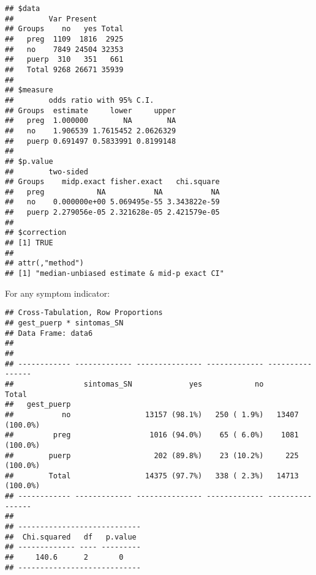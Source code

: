 \documentclass[
]{article}
\newenvironment{Shaded}{\begin{snugshade}}{\end{snugshade}}
\newcommand{\DataTypeTok}[1]{\textcolor[rgb]{0.13,0.29,0.53}{#1}}
\newcommand{\KeywordTok}[1]{\textcolor[rgb]{0.13,0.29,0.53}{\textbf{#1}}}
\newcommand{\NormalTok}[1]{#1}
\newcommand{\OperatorTok}[1]{\textcolor[rgb]{0.81,0.36,0.00}{\textbf{#1}}}
\newcommand{\OtherTok}[1]{\textcolor[rgb]{0.56,0.35,0.01}{#1}}
\newcommand{\StringTok}[1]{\textcolor[rgb]{0.31,0.60,0.02}{#1}}
\begin{document}
\begin{verbatim}
## $data
##        Var Present
## Groups    no   yes Total
##   preg  1109  1816  2925
##   no    7849 24504 32353
##   puerp  310   351   661
##   Total 9268 26671 35939
## 
## $measure
##        odds ratio with 95% C.I.
## Groups  estimate     lower     upper
##   preg  1.000000        NA        NA
##   no    1.906539 1.7615452 2.0626329
##   puerp 0.691497 0.5833991 0.8199148
## 
## $p.value
##        two-sided
## Groups    midp.exact fisher.exact   chi.square
##   preg            NA           NA           NA
##   no    0.000000e+00 5.069495e-55 3.343822e-59
##   puerp 2.279056e-05 2.321628e-05 2.421579e-05
## 
## $correction
## [1] TRUE
## 
## attr(,"method")
## [1] "median-unbiased estimate & mid-p exact CI"
\end{verbatim}

For any symptom indicator:

\begin{Shaded}
\end{Shaded}

\begin{verbatim}
## Cross-Tabulation, Row Proportions  
## gest_puerp * sintomas_SN  
## Data Frame: data6  
## 
## 
## ------------ ------------- --------------- ------------- ----------------
##                sintomas_SN             yes            no            Total
##   gest_puerp                                                             
##           no                 13157 (98.1%)   250 ( 1.9%)   13407 (100.0%)
##         preg                  1016 (94.0%)    65 ( 6.0%)    1081 (100.0%)
##        puerp                   202 (89.8%)    23 (10.2%)     225 (100.0%)
##        Total                 14375 (97.7%)   338 ( 2.3%)   14713 (100.0%)
## ------------ ------------- --------------- ------------- ----------------
## 
## ----------------------------
##  Chi.squared   df   p.value 
## ------------- ---- ---------
##     140.6      2       0    
## ----------------------------
\end{verbatim}
\end{document}

